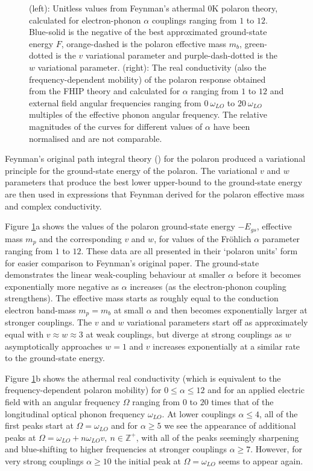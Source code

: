 \begin{figure}
{\begin{subfigure}[b]{.6\textwidth}
\end{subfigure}%
}
\caption{(left): Unitless values from Feynman's athermal $0$K polaron theory, calculated for electron-phonon $\alpha$ couplings ranging from $1$ to $12$. Blue-solid is the negative of the best approximated ground-state energy $F$, orange-dashed is the polaron effective mass $m_b$, green-dotted is the $v$ variational parameter and purple-dash-dotted is the $w$ variational parameter. (right): The real conductivity (also the frequency-dependent mobility) of the polaron response obtained from the FHIP theory and calculated for $\alpha$ ranging from $1$ to $12$ and external field angular frequencies ranging from $0\ \omega_{LO}$ to $20\ \omega_{LO}$ multiples of the effective phonon angular frequency. The relative magnitudes of the curves for different values of $\alpha$ have been normalised and are not comparable.}
\label{fig:athermaltheory}
\end{figure}

Feynman's original path integral theory (\cite{feynman_slow_1955}) for the polaron produced a variational principle for the ground-state energy of the polaron. The variational $v$ and $w$ parameters that produce the best lower upper-bound to the ground-state energy are then used in expressions that Feynman derived for the polaron effective mass and complex conductivity. 

Figure \ref{fig:athermaltheory}a shows the values of the polaron ground-state energy $-E_{gs}$, effective mass $m_p$ and the corresponding $v$ and $w$, for values of the Fr\"ohlich $\alpha$ parameter ranging from $1$ to $12$. These data are all presented in their `polaron units' form for easier comparison to Feynman's original paper. The ground-state demonstrates the linear weak-coupling behaviour at smaller $\alpha$ before it becomes exponentially more negative as $\alpha$ increases (as the electron-phonon coupling strengthens). The effective mass starts as roughly equal to the conduction electron band-mass $m_p = m_b $ at small $\alpha$ and then becomes exponentially larger at stronger couplings. The $v$ and $w$ variational parameters start off as approximately equal with $v \approx w \approx 3$ at weak couplings, but diverge at strong couplings as $w$ asymptotically approaches $w = 1$ and $v$ increases exponentially at a similar rate to the ground-state energy. 

Figure \ref{fig:athermaltheory}b shows the athermal real conductivity (which is equivalent to the frequency-dependent polaron mobility) for $0 \leq \alpha \leq 12$ and for an applied electric field with an angular frequency $\Omega$ ranging from $0$ to $20$ times that of the longitudinal optical phonon frequency $\omega_{LO}$. At lower couplings $\alpha \leq 4$, all of the first peaks start at $\Omega = \omega_{LO}$ and for $\alpha \geq 5$ we see the appearance of additional peaks at $\Omega = \omega_{LO} + n \omega_{LO} v,\ n \in \mathbb{Z}^+$, with all of the peaks seemingly sharpening and blue-shifting to higher frequencies at stronger couplings $\alpha \geq 7$. However, for very strong couplings $\alpha \geq 10$ the initial peak at $\Omega = \omega_{LO}$ seems to appear again.

